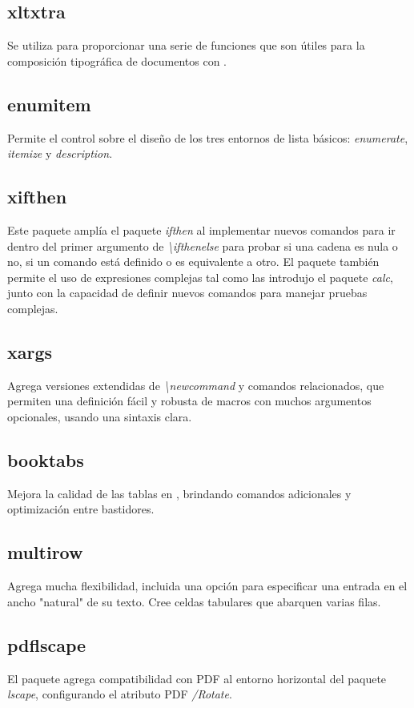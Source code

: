 \documentclass[12pt]{article}
\begin{document}
\subsection{xltxtra}
Se utiliza para proporcionar una serie de funciones que son útiles para la composición tipográfica de documentos con . \cite{xltxtra}
\subsection{enumitem}
Permite el control sobre el diseño de los tres entornos de lista básicos: \textit{enumerate}, \textit{itemize} y \textit{description}.\cite{enumitem}
\subsection{xifthen}
Este paquete amplía el paquete \textit{ifthen} al implementar nuevos comandos para ir dentro del primer argumento de \textit{\textbackslash ifthenelse} para probar si una cadena es nula o no, si un comando está definido o es equivalente a otro. El paquete también permite el uso de expresiones complejas tal como las introdujo el paquete \textit{calc}, junto con la capacidad de definir nuevos comandos para manejar pruebas complejas.\cite{xifthen}
\subsection{xargs}
Agrega versiones extendidas de \textit{\textbackslash newcommand} y comandos  relacionados, que permiten una definición fácil y robusta de macros con muchos argumentos opcionales, usando una sintaxis clara.\cite{xargs}
\subsection{booktabs}
Mejora la calidad de las tablas en , brindando comandos adicionales y optimización entre bastidores.\cite{booktabs}
\subsection{multirow}
Agrega mucha flexibilidad, incluida una opción para especificar una entrada en el ancho "natural" de su texto. Cree celdas tabulares que abarquen varias filas.\cite{multirow}
\subsection{pdflscape}
El paquete agrega compatibilidad con PDF al entorno horizontal del paquete \textit{lscape}, configurando el atributo PDF \textit{/Rotate}.\cite{pdflscape}
\end{document}
